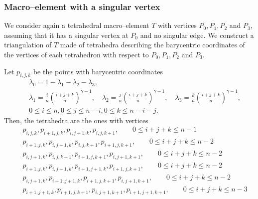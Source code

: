 \subsubsection{Macro--element with a singular vertex}

We consider again a tetrahedral macro--element $T$ with vertices $P_0, P_1, P_2$
and $P_3$, assuming that it has a singular vertex at $P_0$ and no singular edge.
We construct a triangulation of $T$ made of tetrahedra describing 
the barycentric coordinates of the vertices of each tetrahedron with respect
to $P_0, P_1, P_2$ and $P_3$. %

Let $p_{i,j,k}$ be the points with barycentric coordinates
\begin{eqnarray*}
&&\lambda_0=1-\lambda_1-\lambda_2-\lambda_3,\\[5pt]
&&\lambda_1=\frac in\left(\frac{i+j+k}n\right)^{\gamma-1},\quad
  \lambda_2=\frac jn\left(\frac{i+j+k}n\right)^{\gamma-1},\quad
  \lambda_3=\frac kn\left(\frac{i+j+k}n\right)^{\gamma-1},
\\[5pt] &&0\le i\le n, 0\le j\le n-i, 0\le k\le n-i-j.
\end{eqnarray*}
Then, the tetrahedra are the ones with vertices
\begin{eqnarray*}
&& p_{i,j,k}, p_{i+1,j,k}, p_{i,j+1,k}, p_{i,j,k+1}, \qquad 0\le i+j+k\le n-1\\
&& p_{i+1,j,k}, p_{i,j+1,k}, p_{i,j,k+1}, p_{i+1,j,k+1}, \qquad 0\le i+j+k\le n-2\\
&& p_{i,j+1,k}, p_{i,j,k+1}, p_{i+1,j,k+1}, p_{i,j+1,k+1}, \qquad 0\le i+j+k\le n-2\\
&& p_{i+1,j,k}, p_{i,j+1,k}, p_{i+1,j+1,k}, p_{i+1,j,k+1}, \qquad 0\le i+j+k\le n-2\\
&& p_{i,j+1,k}, p_{i+1,j+1,k}, p_{i+1,j,k+1}, p_{i,j+1,k+1}, \qquad 0\le i+j+k\le n-2\\
&& p_{i+1,j+1,k}, p_{i+1,j,k+1}, p_{i,j+1,k+1}, p_{i+1,j+1,k+1}, \qquad 0\le i+j+k\le n-3
\end{eqnarray*}


